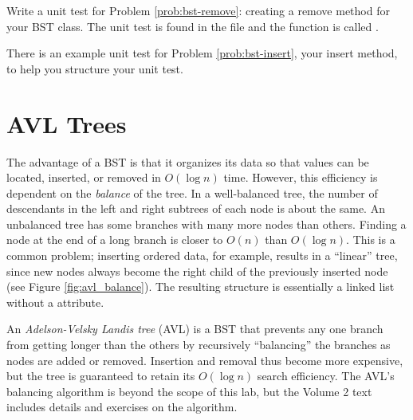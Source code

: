 \begin{unittest}
Write a unit test for Problem \ref{prob:bst-remove}: creating a remove method for your BST class. 
The unit test is found in the file  and the function is called .

\noindent There is an example unit test for Problem \ref{prob:bst-insert}, your insert method, to help you structure your unit test.
\end{unittest}

\section*{AVL Trees} %

The advantage of a BST is that it organizes its data so that values can be located, inserted, or removed in $O(\log{n})$ time.
However, this efficiency is dependent on the \emph{balance} of the tree.
In a well-balanced tree, the number of descendants in the left and right subtrees of each node is about the same.
An unbalanced tree has some branches with many more nodes than others.
Finding a node at the end of a long branch is closer to $O(n)$ than $O(\log{n})$.
This is a common problem; inserting ordered data, for example, results in a ``linear'' tree, since new nodes always become the right child of the previously inserted node (see Figure \ref{fig:avl_balance}).
The resulting structure is essentially a linked list without a  attribute.

\begin{comment}
\begin{lstlisting}
# Sequentially adding ordered data destroys the efficiency of a BST.
>>> unbalanced_tree = BST()
>>> for i in range(10):
...     unbalanced_tree.insert(i)
...
# The tree is perfectly flat, so it loses its search efficiency.
>>> print(unbalanced_tree)
[0]
[1]
[2]
[3]
[4]
[5]
[6]
[7]
[8]
[9]

>>> balanced_tree = AVL()
>>> for i in range(10):
...     balanced_tree.insert(i)
...
# The AVL tree is balanced, so it retains its search efficiency.
>>> print(balanced_tree)
[3]
[1, 7]
[0, 2, 5, 8]
[4, 6, 9]
\end{lstlisting}
\end{comment}

An \emph{Adelson-Velsky Landis tree} (AVL) is a BST that prevents any one branch from getting longer than the others by recursively ``balancing'' the branches as nodes are added or removed.
Insertion and removal thus become more expensive, but the tree is guaranteed to retain its $O(\log{n})$ search efficiency.
The AVL's balancing algorithm is beyond the scope of this lab, but the Volume 2 text includes details and exercises on the algorithm.

